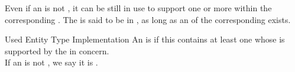\documentclass[a4paper, 12pt]{book}
\begin{document}
Even if an  is not , it can be still in use to support one or more 
within the corresponding . The  is
said to be in , as long as an
 of the corresponding  exists. 
\begin{definition*}{Used Entity Type Implementation}
  An  is 
  if this  contains at least one  whose  is
  supported by the  in concern.\\
  If an  is not , we say it is
  . 
\end{definition*}
\end{document}
